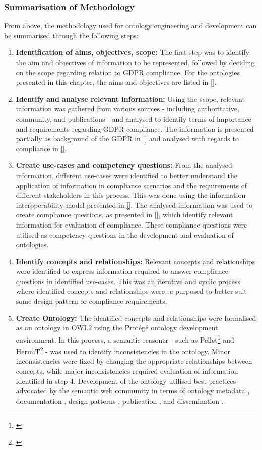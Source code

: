 \subsubsection*{Summarisation of Methodology}
From above, the methodology used for ontology engineering and development can be summarised through the following steps:
\begin{enumerate}
    \item \textbf{Identification of aims, objectives, scope:} The first step was to identify the aim and objectives of information to be represented, followed by deciding on the scope regarding relation to GDPR compliance. For the ontologies presented in this chapter, the aims and objectives are listed in \autoref{}. %
    \item \textbf{Identify and analyse relevant information:} Using the scope, relevant information was gathered from various sources - including authoritative, community, and publications - and analysed to identify terms of importance and requirements regarding GDPR compliance. The information is presented partially as background of the GDPR in \autoref{} and analysed with regards to compliance in \autoref{}.
    \item \textbf{Create use-cases and competency questions:} From the analysed information, different use-cases were identified to better understand the application of information in compliance scenarios and the requirements of different stakeholders in this process. This was done using the information interoperability model presented in \autoref{}. The analysed information was used to create compliance questions, as presented in \autoref{}, which identify relevant information for evaluation of compliance. These compliance questions were utilised as competency questions in the development and evaluation of ontologies.
    \item \textbf{Identify concepts and relationships:} Relevant concepts and relationships were identified to express information required to answer compliance questions in identified use-cases. This was an iterative and cyclic process where identified concepts and relationships were re-purposed to better suit some design pattern or compliance requirements.
    \item \textbf{Create Ontology:} The identified concepts and relationships were formalised as an ontology in OWL2 using the Protégé ontology development environment. In this process, a semantic reasoner - such as Pellet\footnote{\url{}} and HermiT\footnote{\url{}} - was used to identify inconsistencies in the ontology. Minor inconsistencies were fixed by changing the appropriate relationships between concepts, while major inconsistencies required evaluation of information identified in step 4. Development of the ontology utilised best practices advocated by the semantic web community in terms of ontology metadata \cite{}, documentation \cite{}, design patterns \cite{}, publication \cite{}, and dissemination \cite{}.

\end{enumerate}
